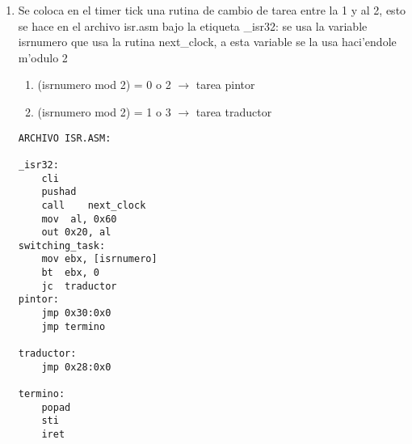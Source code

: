 \documentclass[11pt]{article}
\begin{document}
\begin{enumerate}
\item
Se coloca en el timer tick una rutina de cambio de tarea entre la 1 y al 2, esto se hace en el archivo isr.asm bajo la etiqueta \_isr32:
\indent	se usa la variable isrnumero que usa la rutina next\_clock, a esta variable se la usa haci'endole m'odulo 2
\begin{enumerate}
\item
(isrnumero mod 2) = 0 o 2 $\rightarrow$ tarea pintor

\item
(isrnumero mod 2) = 1 o 3 $\rightarrow$ tarea traductor

\end{enumerate}

\begin{lstlisting}[frame=single]
ARCHIVO ISR.ASM:

_isr32:
	cli
	pushad
	call	next_clock
	mov  al, 0x60
	out 0x20, al
switching_task:
	mov	ebx, [isrnumero]
	bt	ebx, 0
	jc	traductor
pintor:
	jmp	0x30:0x0
	jmp	termino

traductor:
	jmp	0x28:0x0

termino:
	popad
	sti
	iret
\end{lstlisting}

\end{enumerate}
\end{document}
